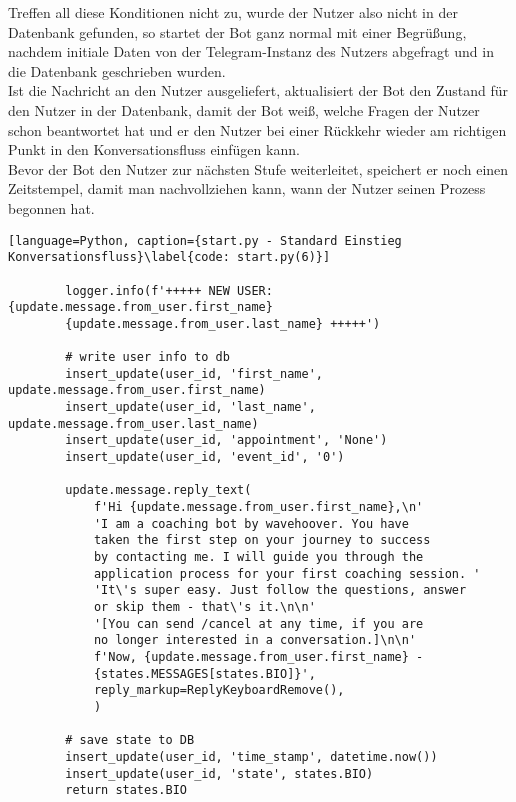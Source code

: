             Treffen all diese Konditionen nicht zu, wurde der Nutzer also nicht in der Datenbank gefunden, so startet der Bot ganz normal mit einer Begrüßung, nachdem initiale Daten von der Telegram-Instanz des Nutzers abgefragt und in die Datenbank geschrieben wurden. \\
            Ist die Nachricht an den Nutzer ausgeliefert, aktualisiert der Bot den Zustand für den Nutzer in der Datenbank, damit der Bot weiß, welche Fragen der Nutzer schon beantwortet hat und er den Nutzer bei einer Rückkehr wieder am richtigen Punkt in den Konversationsfluss einfügen kann.\\
            Bevor der Bot den Nutzer zur nächsten Stufe weiterleitet, speichert er noch einen Zeitstempel, damit man nachvollziehen kann, wann der Nutzer seinen Prozess begonnen hat.
            \begin{lstlisting}[language=Python, caption={start.py - Standard Einstieg Konversationsfluss}\label{code: start.py(6)}]

        logger.info(f'+++++ NEW USER: {update.message.from_user.first_name} 
        {update.message.from_user.last_name} +++++')

        # write user info to db
        insert_update(user_id, 'first_name', update.message.from_user.first_name) 
        insert_update(user_id, 'last_name', update.message.from_user.last_name)
        insert_update(user_id, 'appointment', 'None')
        insert_update(user_id, 'event_id', '0')

        update.message.reply_text(
            f'Hi {update.message.from_user.first_name},\n'
            'I am a coaching bot by wavehoover. You have 
            taken the first step on your journey to success 
            by contacting me. I will guide you through the 
            application process for your first coaching session. '
            'It\'s super easy. Just follow the questions, answer 
            or skip them - that\'s it.\n\n'
            '[You can send /cancel at any time, if you are 
            no longer interested in a conversation.]\n\n'
            f'Now, {update.message.from_user.first_name} - 
            {states.MESSAGES[states.BIO]}',
            reply_markup=ReplyKeyboardRemove(),
            )

        # save state to DB
        insert_update(user_id, 'time_stamp', datetime.now())
        insert_update(user_id, 'state', states.BIO)
        return states.BIO
            \end{lstlisting}
            

